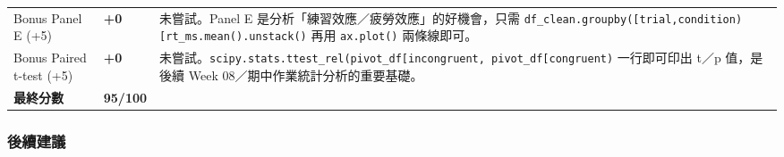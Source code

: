 \documentclass[
  14pt,
]{extarticle}
\begin{document}
\begin{longtable}[]{@{}lll@{}}
\begin{minipage}[t]{0.10\columnwidth}\raggedright
Bonus Panel E (+5)\strut
\end{minipage} & \begin{minipage}[t]{0.04\columnwidth}\raggedright
\textbf{+0}\strut
\end{minipage} & \begin{minipage}[t]{0.78\columnwidth}\raggedright
未嘗試。Panel E 是分析「練習效應／疲勞效應」的好機會，只需
\texttt{df\_clean.groupby({[}\textquotesingle{}trial\textquotesingle{},\textquotesingle{}condition\textquotesingle{}{]}){[}\textquotesingle{}rt\_ms\textquotesingle{}{]}.mean().unstack()}
再用 \texttt{ax.plot()} 兩條線即可。\strut
\end{minipage}\tabularnewline
\begin{minipage}[t]{0.10\columnwidth}\raggedright
Bonus Paired t-test (+5)\strut
\end{minipage} & \begin{minipage}[t]{0.04\columnwidth}\raggedright
\textbf{+0}\strut
\end{minipage} & \begin{minipage}[t]{0.78\columnwidth}\raggedright
未嘗試。\texttt{scipy.stats.ttest\_rel(pivot\_df{[}\textquotesingle{}incongruent\textquotesingle{}{]},\ pivot\_df{[}\textquotesingle{}congruent\textquotesingle{}{]})}
一行即可印出 t／p 值，是後續 Week 08／期中作業統計分析的重要基礎。\strut
\end{minipage}\tabularnewline
\begin{minipage}[t]{0.10\columnwidth}\raggedright
\textbf{最終分數}\strut
\end{minipage} & \begin{minipage}[t]{0.04\columnwidth}\raggedright
\textbf{95/100}\strut
\end{minipage} & \begin{minipage}[t]{0.78\columnwidth}\raggedright
\strut
\end{minipage}\tabularnewline
\bottomrule
\end{longtable}

\hypertarget{ux5f8cux7e8cux5efaux8b70}{%
\subsubsection{後續建議}\label{ux5f8cux7e8cux5efaux8b70}}
\end{document}
